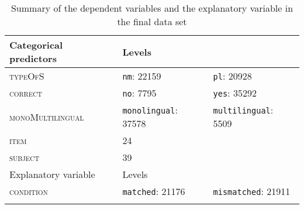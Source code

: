 \begin{table}[H]\fontsize{10}{11}
\caption{Summary of the dependent variables and the explanatory variable in the final data set}
\label{tab:7.6}
\centering
\begin{tabular}{lllll} 
\lsptoprule
Categorical predictors & Levels & ~                               & ~ & ~                                     \\ 
\midrule
\textsc{typeOfS}                & \multicolumn{2}{l}{\texttt{nm}: 22159}            & \multicolumn{2}{l}{\texttt{pl}:
  20928}           \\
\textsc{correct}                & \multicolumn{2}{l}{\texttt{no}: 7795}             & \multicolumn{2}{l}{\texttt{yes}: 35292}            \\
\textsc{monoMultilingual}       & \multicolumn{2}{l}{\texttt{monolingual}:
  37578} & \multicolumn{2}{l}{\texttt{multilingual}:
  5509}  \\
\textsc{item}                   & 24     & ~                               & ~ & ~                                     \\
\textsc{subject}                & 39     & ~                               & ~ & ~                                     \\ 
\midrule
Explanatory variable   & Levels & ~                               & ~ & ~                                     \\ 
\midrule
\textsc{condition}              & \multicolumn{2}{l}{\texttt{matched}:
  21176}     & \multicolumn{2}{l}{\texttt{mismatched}:
  21911}   \\
\lspbottomrule
\end{tabular}
\end{table}






